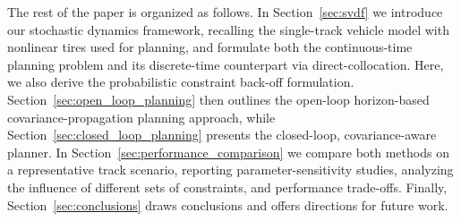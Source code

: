 The rest of the paper is organized as follows. 
In Section~\ref{sec:svdf} we introduce our stochastic dynamics framework, recalling the single-track vehicle model with nonlinear tires used for planning, and formulate both the continuous-time planning problem and its discrete-time counterpart via direct-collocation. Here, we also derive the probabilistic constraint back-off formulation.
Section~\ref{sec:open_loop_planning} then outlines the open-loop horizon-based covariance-propagation planning approach, while Section~\ref{sec:closed_loop_planning} presents the closed-loop, covariance-aware planner. In Section~\ref{sec:performance_comparison} we compare both methods on a representative track scenario, reporting parameter-sensitivity studies, analyzing the influence of different sets of constraints, and performance trade-offs. 
Finally, Section~\ref{sec:conclusions} draws conclusions and offers directions for future work.
  